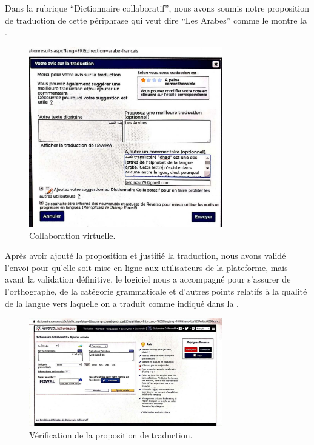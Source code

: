 \documentclass{textolivre}
\begin{document}
Dans la rubrique “Dictionnaire collaboratif”, nous avons soumis notre proposition de traduction de cette périphrase qui veut dire “Les Arabes” comme le montre la .

\begin{figure}[htbp]
 \centering
 \includegraphics[width=0.75\textwidth]{figure06.pdf}
 \caption{Collaboration virtuelle.}
 \label{fig-06}
\end{figure}

Après avoir ajouté la proposition et justifié la traduction, nous avons validé l’envoi pour qu’elle soit mise en ligne aux utilisateurs de la plateforme, mais avant la validation définitive, le logiciel nous a accompagné pour s’assurer de l’orthographe, de la catégorie grammaticale et d’autres points relatifs à la qualité de la langue vers laquelle on a traduit comme indiqué dans la . 

\begin{figure}[htbp]
 \centering
 \includegraphics[width=0.75\textwidth]{figure07.pdf}
 \caption{Vérification de la proposition de traduction.}
 \label{fig-07}
\end{figure}
\end{document}
